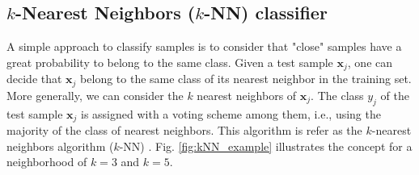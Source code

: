 
\subsection{$k$-Nearest Neighbors ($k$-NN) classifier}
\label{sec:kNN}

A simple approach to classify samples is to consider that "close" samples have a great probability to belong to the same class. Given a test sample $\textbf{x}_j$, one can decide that $\textbf{x}_j$ belong to the same class of its nearest neighbor in the training set. More generally, we can consider the $k$ nearest neighbors of $\textbf{x}_j$. The class $y_j$ of the test sample $\textbf{x}_j$ is assigned with a voting scheme among them, i.e., using the majority of the class of nearest neighbors. This algorithm is refer as the $k$-nearest neighbors algorithm ($k$-NN) 
\cite{Cover1967b,Duda1973}. Fig. \ref{fig:kNN_example} illustrates the concept for a neighborhood of $k=3$ and $k=5$.

